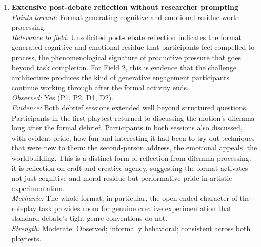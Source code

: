 \documentclass[12pt]{article}
\begin{document}
\begin{enumerate}
\item \textbf{Extensive post-debate reflection without researcher prompting}\\
\textit{Points toward:} Format generating cognitive and emotional residue worth processing.\\
\textit{Relevance to field:} Unsolicited post-debate reflection indicates the format generated cognitive and emotional residue that participants feel compelled to process, the phenomenological signature of productive pressure that goes beyond task completion. For Field 2, this is evidence that the challenge architecture produces the kind of generative engagement participants continue working through after the formal activity ends.\\
\textit{Observed:} Yes (P1, P2, D1, D2).\\
\textit{Evidence:} Both debrief sessions extended well beyond structured questions. Participants in the first playtest returned to discussing the motion's dilemma long after the formal debrief. Participants in both sessions also discussed, with evident pride, how fun and interesting it had been to try out techniques that were new to them: the second-person address, the emotional appeals, the worldbuilding. This is a distinct form of reflection from dilemma-processing: it is reflection on craft and creative agency, suggesting the format activates not just cognitive and moral residue but performative pride in artistic experimentation.\\
\textit{Mechanic:} The whole format; in particular, the open-ended character of the roleplay task provides room for genuine creative experimentation that standard debate's tight genre conventions do not.\\
\textit{Strength:} Moderate. Observed; informally behavioral; consistent across both playtests.


\end{enumerate}
\end{document}
